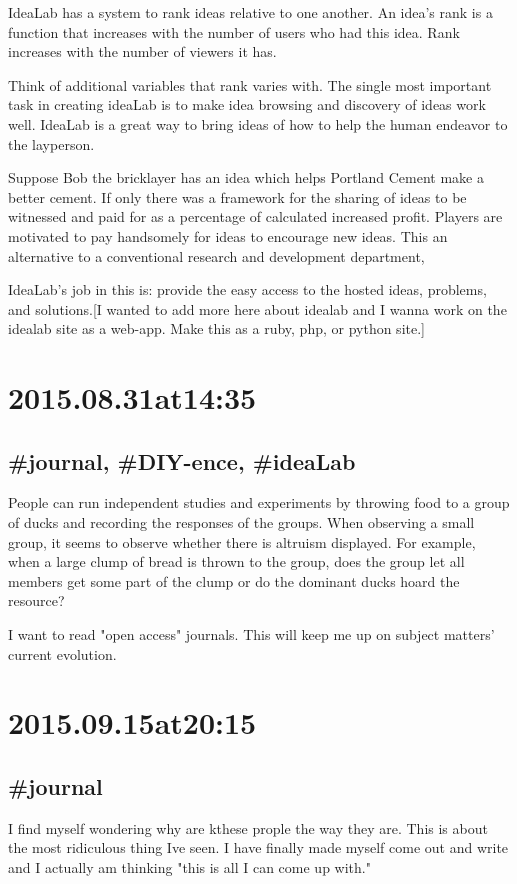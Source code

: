 IdeaLab has a system to rank ideas relative to one another. An idea's rank is a function that increases with the number of users who had this idea. Rank increases with the number of viewers it has.

Think of additional variables that rank varies with. The single most important task in creating ideaLab is to make idea browsing and discovery of ideas work well. IdeaLab is a great way to bring ideas of how to help the human endeavor to the layperson.

Suppose Bob the bricklayer has an idea which helps Portland Cement make a better cement. If only there was a framework for the sharing of ideas to be witnessed and paid for as a percentage of calculated increased profit. Players are motivated to pay handsomely for ideas to encourage new ideas. This an alternative to a conventional research and development department,

IdeaLab's job in this is:  provide the easy access to the hosted ideas, problems, and solutions.[I wanted to add more here about idealab and I wanna work on the idealab site as a web-app. Make this as a ruby, php, or python site.]

\section*{2015.08.31at14:35}
\subsection*{\#journal, \#DIY-ence, \#ideaLab}
People can run independent studies and experiments by throwing food to a group of ducks and recording the responses of the groups. When observing a small group, it seems to observe whether there is altruism displayed. For example, when a large clump of bread is thrown to the group, does the group let all members get some part of the clump or do the dominant ducks hoard the resource?

I want to read "open access" journals. This will keep me up on subject matters' current evolution.

\section*{2015.09.15at20:15}
\subsection*{\#journal}
I find myself wondering why are kthese prople the way they are. This is about the most ridiculous thing Ive seen. I have finally made myself come out and write and I actually am thinking "this is all I can come up with."

